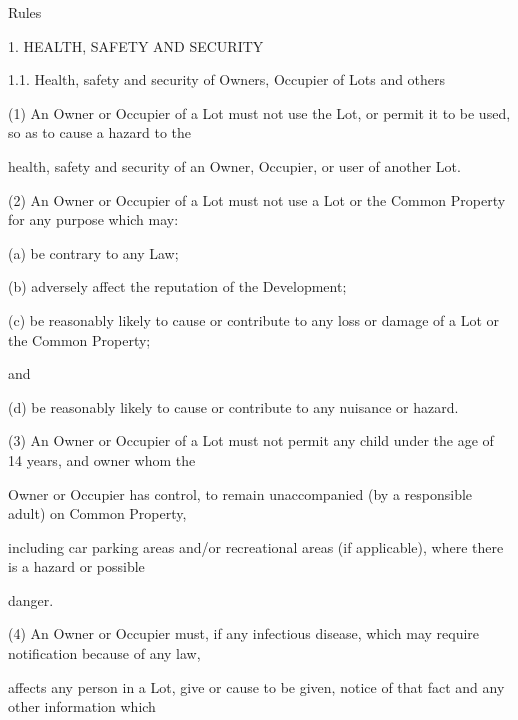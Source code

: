 \documentclass{article}
\begin{document}
\newpage


















{\fontsize{10.02}{1}Rules }

{\fontsize{9.99}{1}1. HEALTH, SAFETY AND SECURITY }

{\fontsize{9.99}{1}1.1. Health, safety and security of Owners, Occupier of Lots and others }

{\fontsize{9.962}{1}(1) An Owner or Occupier of a Lot must not use the Lot, or permit it to be used, so as to cause a hazard to the }

{\fontsize{10.02}{1}health, safety and security of an Owner, Occupier, or user of another Lot. }

{\fontsize{9.962}{1}(2) An Owner or Occupier of a Lot must not use a Lot or the Common Property for any purpose which may: }

{\fontsize{9.962}{1}(a) be contrary to any Law; }

{\fontsize{9.962}{1}(b) adversely affect the reputation of the Development;  }

{\fontsize{9.962}{1}(c) be reasonably likely to cause or contribute to any loss or damage of a Lot or the Common Property; }

{\fontsize{10.02}{1}and }

{\fontsize{9.962}{1}(d) be reasonably likely to cause or contribute to any nuisance or hazard. }

{\fontsize{9.962}{1}(3) An Owner or Occupier of a Lot must not permit any child under the age of 14 years, and owner whom the }

{\fontsize{10.02}{1}Owner or Occupier has control, to remain unaccompanied (by a responsible adult) on Common Property, }

{\fontsize{10.02}{1}including car parking areas and/or recreational areas (if applicable), where there is a hazard or possible }

{\fontsize{10.02}{1}danger. }

{\fontsize{9.962}{1}(4) An Owner or Occupier must, if any infectious disease, which may require notification because of any law, }

{\fontsize{10.02}{1}affects any person in a Lot, give or cause to be given, notice of that fact and any other information which }
\end{document}
